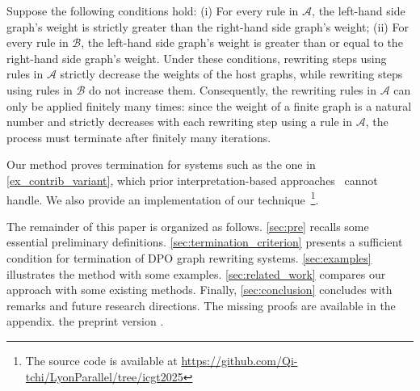 Suppose the following conditions hold: (i) For every rule in \( \mathcal{A} \), the left-hand side graph's weight is strictly greater than the right-hand side graph's weight; (ii) For every rule in \( \mathcal{B} \), the left-hand side graph's weight is greater than or equal to the right-hand side graph's weight. 
Under these conditions, rewriting steps using rules in \( \mathcal{A} \) strictly decrease the weights of the host graphs, while rewriting steps using rules in \( \mathcal{B} \) do not increase them.
Consequently, the rewriting rules in \( \mathcal{A} \) can only be applied finitely many times: since the weight of a finite graph is a natural number and strictly decreases with each rewriting step using a rule in \( \mathcal{A} \), the process must terminate after finitely many iterations.  

Our method proves termination for systems such as the one in \autoref{ex_contrib_variant}, which prior interpretation-based approaches~\cite{zantema2014termination,bruggink2014termination,bruggink2015proving,endrullis2024generalized,overbeek2024termination_lmcs} cannot handle. 
We also provide an implementation of our technique~\footnote{The source code is available at \url{https://github.com/Qi-tchi/LyonParallel/tree/icgt2025}}.  
  
The remainder of this paper is organized as follows.
\autoref{sec:pre} recalls some essential preliminary definitions. 
\autoref{sec:termination_criterion} presents a sufficient condition for termination of DPO graph rewriting systems.
\autoref{sec:examples} illustrates the method with some examples.
\autoref{sec:related_work} compares our approach with some existing methods.
Finally, \autoref{sec:conclusion} concludes with remarks and future research directions. The missing proofs are available in 
\iflongversion
the appendix.
\else
the preprint version \cite{qiu2025termination}.
\fi